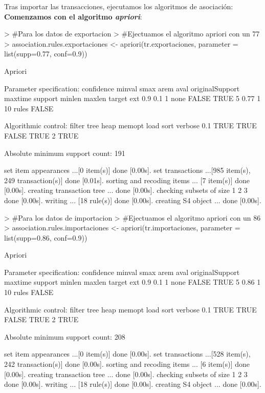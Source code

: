 \documentclass [a4paper] {article}
\begin{document}
Tras importar las transacciones, ejecutamos los algoritmos de asociación:
\textbf{Comenzamos con el algoritmo \textit{apriori}}:

\begin{Schunk}
\begin{Sinput}
> #Para los datos de exportacion
> #Ejectuamos el algoritmo apriori con un 77% de soporte y un 90% de confianza
> association.rules.exportaciones <- apriori(tr.exportaciones, parameter = list(supp=0.77, conf=0.9))
\end{Sinput}
\begin{Soutput}
Apriori

Parameter specification:
 confidence minval smax arem  aval originalSupport maxtime support minlen maxlen target   ext
        0.9    0.1    1 none FALSE            TRUE       5    0.77      1     10  rules FALSE

Algorithmic control:
 filter tree heap memopt load sort verbose
    0.1 TRUE TRUE  FALSE TRUE    2    TRUE

Absolute minimum support count: 191 

set item appearances ...[0 item(s)] done [0.00s].
set transactions ...[985 item(s), 249 transaction(s)] done [0.01s].
sorting and recoding items ... [7 item(s)] done [0.00s].
creating transaction tree ... done [0.00s].
checking subsets of size 1 2 3 done [0.00s].
writing ... [18 rule(s)] done [0.00s].
creating S4 object  ... done [0.00s].
\end{Soutput}
\begin{Sinput}
> #Para los datos de importacion
> #Ejectuamos el algoritmo apriori con un 86% de soporte y un 90% de confianza
> association.rules.importaciones <- apriori(tr.importaciones, parameter = list(supp=0.86, conf=0.9))
\end{Sinput}
\begin{Soutput}
Apriori

Parameter specification:
 confidence minval smax arem  aval originalSupport maxtime support minlen maxlen target   ext
        0.9    0.1    1 none FALSE            TRUE       5    0.86      1     10  rules FALSE

Algorithmic control:
 filter tree heap memopt load sort verbose
    0.1 TRUE TRUE  FALSE TRUE    2    TRUE

Absolute minimum support count: 208 

set item appearances ...[0 item(s)] done [0.00s].
set transactions ...[528 item(s), 242 transaction(s)] done [0.00s].
sorting and recoding items ... [6 item(s)] done [0.00s].
creating transaction tree ... done [0.00s].
checking subsets of size 1 2 3 done [0.00s].
writing ... [18 rule(s)] done [0.00s].
creating S4 object  ... done [0.00s].
\end{Soutput}
\end{Schunk}
\end{document}
